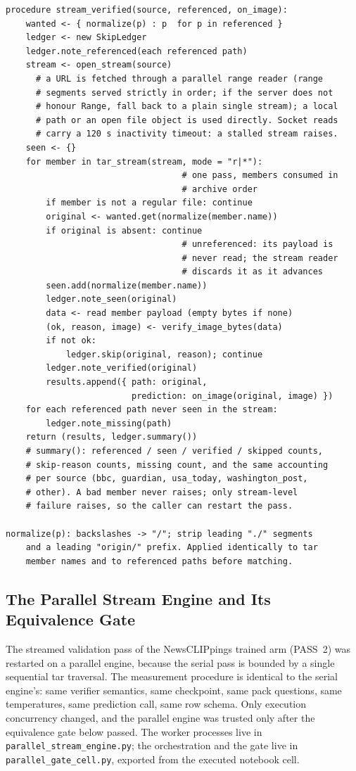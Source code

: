 \documentclass{article} %
\begin{document}
{\footnotesize\begin{verbatim}
procedure stream_verified(source, referenced, on_image):
    wanted <- { normalize(p) : p  for p in referenced }
    ledger <- new SkipLedger
    ledger.note_referenced(each referenced path)
    stream <- open_stream(source)
      # a URL is fetched through a parallel range reader (range
      # segments served strictly in order; if the server does not
      # honour Range, fall back to a plain single stream); a local
      # path or an open file object is used directly. Socket reads
      # carry a 120 s inactivity timeout: a stalled stream raises.
    seen <- {}
    for member in tar_stream(stream, mode = "r|*"):
                                   # one pass, members consumed in
                                   # archive order
        if member is not a regular file: continue
        original <- wanted.get(normalize(member.name))
        if original is absent: continue
                                   # unreferenced: its payload is
                                   # never read; the stream reader
                                   # discards it as it advances
        seen.add(normalize(member.name))
        ledger.note_seen(original)
        data <- read member payload (empty bytes if none)
        (ok, reason, image) <- verify_image_bytes(data)
        if not ok:
            ledger.skip(original, reason); continue
        ledger.note_verified(original)
        results.append({ path: original,
                         prediction: on_image(original, image) })
    for each referenced path never seen in the stream:
        ledger.note_missing(path)
    return (results, ledger.summary())
    # summary(): referenced / seen / verified / skipped counts,
    # skip-reason counts, missing count, and the same accounting
    # per source (bbc, guardian, usa_today, washington_post,
    # other). A bad member never raises; only stream-level
    # failure raises, so the caller can restart the pass.

normalize(p): backslashes -> "/"; strip leading "./" segments
    and a leading "origin/" prefix. Applied identically to tar
    member names and to referenced paths before matching.
\end{verbatim}}

\subsection{The Parallel Stream Engine and Its Equivalence Gate}
\label{app:code-parallel}
The streamed validation pass of the NewsCLIPpings trained arm (PASS~2) was restarted on a parallel engine, because the serial pass is bounded by a single sequential tar traversal. The measurement procedure is identical to the serial engine's: same verifier semantics, same checkpoint, same pack questions, same temperatures, same prediction call, same row schema. Only execution concurrency changed, and the parallel engine was trusted only after the equivalence gate below passed. The worker processes live in \texttt{parallel\_stream\_engine.py}; the orchestration and the gate live in \texttt{parallel\_gate\_cell.py}, exported from the executed notebook cell.
\end{document}
